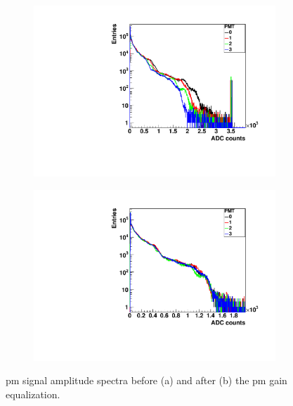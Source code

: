 \begin{figure}
\begin{subfigure}[t]{0.5\textwidth}
\centering
\includegraphics[width=1\textwidth]{03_GraphicFiles/chapter3_CLaRySproto/Absorber/images_charResults_Na22/1_Raw_PMAmp.pdf}
\caption{}
\label{chap3::fig::absPM_rawProfiles}
\end{subfigure}
\begin{subfigure}[t]{0.5\textwidth}
\centering
\includegraphics[width=1\textwidth]{03_GraphicFiles/chapter3_CLaRySproto/Absorber/images_charResults_Na22/2_Cal_PMAmp_noSum.pdf}
\caption{}
\label{chap3::fig::absPM_calProfiles}
\end{subfigure}
\caption{\gls{pm} signal amplitude spectra before (a) and after (b) the \gls{pm} gain equalization.}
\label{chap3::fig::absPM_amp}
\end{figure}

